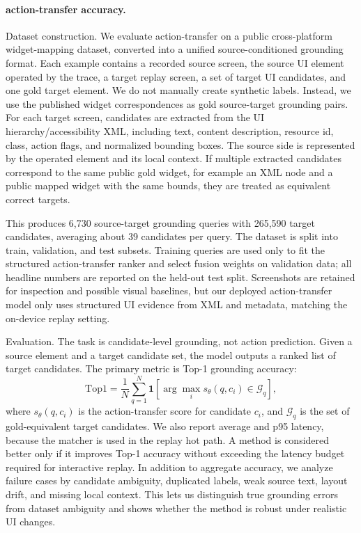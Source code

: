 \paragraph{action-transfer accuracy.}
Dataset construction. We evaluate action-transfer on a public cross-platform widget-mapping dataset, converted into a unified source-conditioned grounding format. Each example contains a recorded source screen, the source UI element operated by the trace, a target replay screen, a set of target UI candidates, and one gold target element. We do not manually create synthetic labels. Instead, we use the published widget correspondences as gold source-target grounding pairs. For each target screen, candidates are extracted from the UI hierarchy/accessibility XML, including text, content description, resource id, class, action flags, and normalized bounding boxes. The source side is represented by the operated element and its local context. If multiple extracted candidates correspond to the same public gold widget, for example an XML node and a public mapped widget with the same bounds, they are treated as equivalent correct targets.

This produces 6,730 source-target grounding queries with 265,590 target candidates, averaging about 39 candidates per query. The dataset is split into train, validation, and test subsets. Training queries are used only to fit the structured action-transfer ranker and select fusion weights on validation data; all headline numbers are reported on the held-out test split. Screenshots are retained for inspection and possible visual baselines, but our deployed action-transfer model only uses structured UI evidence from XML and metadata, matching the on-device replay setting.

Evaluation. The task is candidate-level grounding, not action prediction. Given a source element and a target candidate set, the model outputs a ranked list of target candidates. The primary metric is Top-1 grounding accuracy:
\[
\mathrm{Top1} = \frac{1}{N}\sum_{q=1}^{N}
\mathbf{1}\left[\arg\max_i s_\theta(q, c_i) \in \mathcal{G}_q\right],
\]
where \(s_\theta(q,c_i)\) is the action-transfer score for candidate \(c_i\), and \(\mathcal{G}_q\) is the set of gold-equivalent target candidates. We also report average and p95 latency, because the matcher is used in the replay hot path. A method is considered better only if it improves Top-1 accuracy without exceeding the latency budget required for interactive replay. In addition to aggregate accuracy, we analyze failure cases by candidate ambiguity, duplicated labels, weak source text, layout drift, and missing local context. This lets us distinguish true grounding errors from dataset ambiguity and shows whether the method is robust under realistic UI changes.

